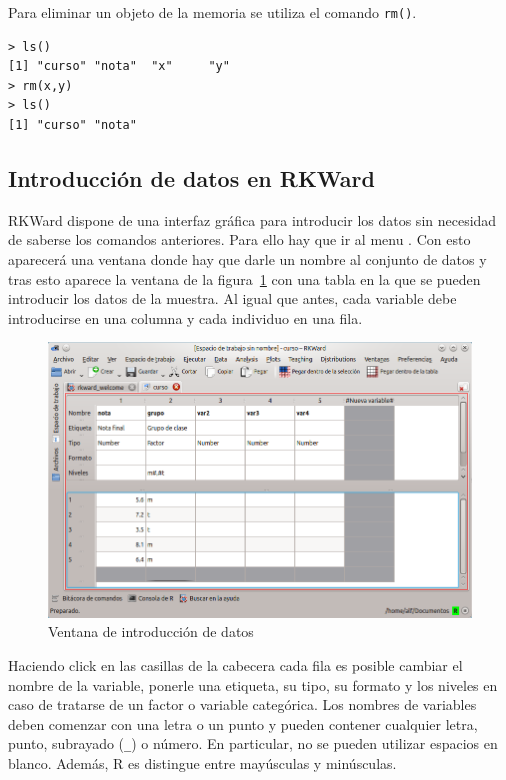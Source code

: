 Para eliminar un objeto de la memoria se utiliza el comando \lstinline{rm()}.
\begin{lstlisting}
> ls()
[1] "curso" "nota"  "x"     "y"    
> rm(x,y)
> ls()
[1] "curso" "nota"
\end{lstlisting}


\subsection{Introducción de datos en RKWard}
RKWard dispone de una interfaz gráfica para introducir los datos sin necesidad de saberse los comandos anteriores.
Para ello hay que ir al menu . Con esto
aparecerá una ventana donde hay que darle un nombre al conjunto de datos y tras esto aparece la ventana de la
figura~\ref{g:matriz_datos} con una tabla en la que se pueden introducir los datos de la muestra.
Al igual que antes, cada variable debe introducirse en una columna y cada individuo en una fila.

\begin{figure}[htp]
\begin{center}
  \includegraphics[scale=0.6]{introduccion_r/img/matriz_datos}
  \caption{Ventana de introducción de datos}
  \label{g:matriz_datos}
\end{center}
\end{figure}

Haciendo click en las casillas de la cabecera cada fila es posible cambiar el nombre de la variable, ponerle una
etiqueta, su tipo, su formato y los niveles en caso de tratarse de un factor o variable categórica.
Los nombres de variables deben comenzar con una letra o un punto y pueden contener cualquier letra, punto, subrayado
(\lstinline{_}) o número.
En particular, no se pueden utilizar espacios en blanco.
Además, R es distingue entre mayúsculas y minúsculas.

